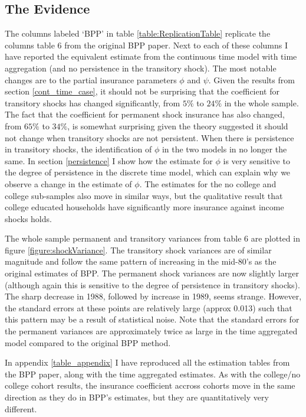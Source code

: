 \documentclass[titlepage]{\econtex}\newcommand{\texname}{BPP_TimeAgg}
\begin{document}
\subsection{The Evidence} \label{evidence}
The columns labeled `BPP' in table \ref{table:ReplicationTable} replicate the columns table 6 from the original BPP paper. Next to each of these columns I have reported the equivalent estimate from the continuous time model with time aggregation (and no persistence in the transitory shock). The most notable changes are to the partial insurance parameters $\phi$ and $\psi$. Given the results from section \ref{cont_time_case}, it should not be surprising that the coefficient for transitory shocks has changed significantly, from $5\%$ to $24\%$ in the whole sample. The fact that the coefficient for permanent shock insurance has also changed, from $65\%$ to $34\%$, is somewhat surprising given the theory suggested it should not change when transitory shocks are not persistent. When there is persistence in transitory shocks, the identification of $\phi$ in the two models in no longer the same. In section \ref{persistence} I show how the estimate for $\phi$ is very sensitive to the degree of persistence in the discrete time model, which can explain why we observe a change in the estimate of $\phi$. The estimates for the no college and college sub-samples also move in similar ways, but the qualitative result that college educated households have significantly more insurance against income shocks holds.

The whole sample permanent and transitory variances from table 6 are plotted in figure \ref{figure:shockVariance}. The transitory shock variances are of similar magnitude and follow the same pattern of increasing in the mid-80's as the original estimates of BPP. The permanent shock variances are now slightly larger (although again this is sensitive to the degree of persistence in transitory shocks). The sharp decrease in 1988, followed by increase in 1989, seems strange. However, the standard errors at these points are relatively large (approx 0.013) such that this pattern may be a result of statistical noise. Note that the standard errors for the permanent variances are approximately twice as large in the time aggregated model compared to the original BPP method.

In appendix \ref{table_appendix} I have reproduced all the estimation tables from the BPP paper, along with the time aggregated estimates. As with the college/no college cohort results, the insurance coefficient accross cohorts move in the same direction as they do in BPP's estimates, but they are quantitatively very different.
\end{document}
